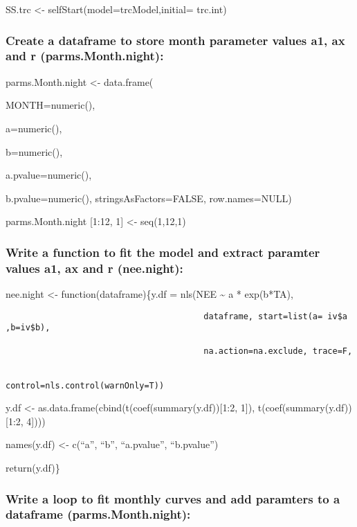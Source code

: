 \documentclass[
]{article}
\begin{document}
SS.trc \textless- selfStart(model=trcModel,initial= trc.int)

\hypertarget{create-a-dataframe-to-store-month-parameter-values-a1-ax-and-r-parms.month.night}{%
\subsubsection{Create a dataframe to store month parameter values a1, ax
and r
(parms.Month.night):}\label{create-a-dataframe-to-store-month-parameter-values-a1-ax-and-r-parms.month.night}}

parms.Month.night \textless- data.frame(

MONTH=numeric(),

a=numeric(),

b=numeric(),

a.pvalue=numeric(),

b.pvalue=numeric(), stringsAsFactors=FALSE, row.names=NULL)

parms.Month.night {[}1:12, 1{]} \textless- seq(1,12,1)

\hypertarget{write-a-function-to-fit-the-model-and-extract-paramter-values-a1-ax-and-r-nee.night}{%
\subsubsection{Write a function to fit the model and extract paramter
values a1, ax and r
(nee.night):}\label{write-a-function-to-fit-the-model-and-extract-paramter-values-a1-ax-and-r-nee.night}}

nee.night \textless- function(dataframe)\{y.df = nls(NEE
\textasciitilde{} a * exp(b*TA),

\begin{verbatim}
                                        dataframe, start=list(a= iv$a ,b=iv$b),
                                        
                                        na.action=na.exclude, trace=F,
                                        
                                        control=nls.control(warnOnly=T))
\end{verbatim}

y.df \textless- as.data.frame(cbind(t(coef(summary(y.df)){[}1:2, 1{]}),
t(coef(summary(y.df)) {[}1:2, 4{]})))

names(y.df) \textless- c(``a'', ``b'', ``a.pvalue'', ``b.pvalue'')

return(y.df)\}

\hypertarget{write-a-loop-to-fit-monthly-curves-and-add-paramters-to-a-dataframe-parms.month.night}{%
\subsubsection{Write a loop to fit monthly curves and add paramters to a
dataframe
(parms.Month.night):}\label{write-a-loop-to-fit-monthly-curves-and-add-paramters-to-a-dataframe-parms.month.night}}
\end{document}
